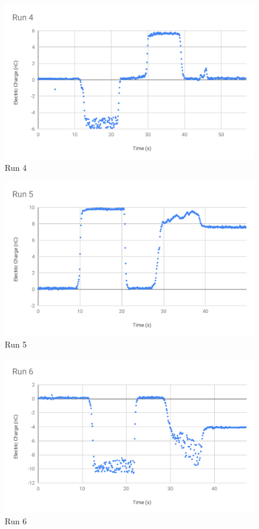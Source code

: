 %
\begin{figure}[ht]
	\centering
	\includegraphics[scale=0.74]{image/01-electro/Run4.pdf}
	\caption{Run 4}
	\label{figure.01.run.4}
\end{figure}
%
\begin{figure}[ht]
	\centering
	\includegraphics[scale=0.74]{image/01-electro/Run5.pdf}
	\caption{Run 5}
	\label{figure.01.run.5}
\end{figure}
%
\begin{figure}[ht]
	\centering
	\includegraphics[scale=0.74]{image/01-electro/Run6.pdf}
	\caption{Run 6}
	\label{figure.01.run.6}
\end{figure}
